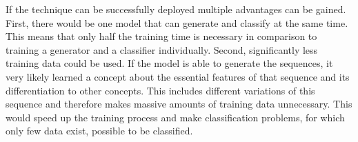 If the technique can be successfully deployed multiple advantages can be gained. First, there would be one model that can generate and classify at the same time. This means that only half the training time is necessary in comparison to training a generator and a classifier individually. Second, significantly less training data could be used. If the model is able to generate the sequences, it very likely learned a concept about the essential features of that sequence and its differentiation to other concepts. This includes different variations of this sequence and therefore makes massive amounts of training data unnecessary. This would speed up the training process and make classification problems, for which only few data exist, possible to be classified. 

 